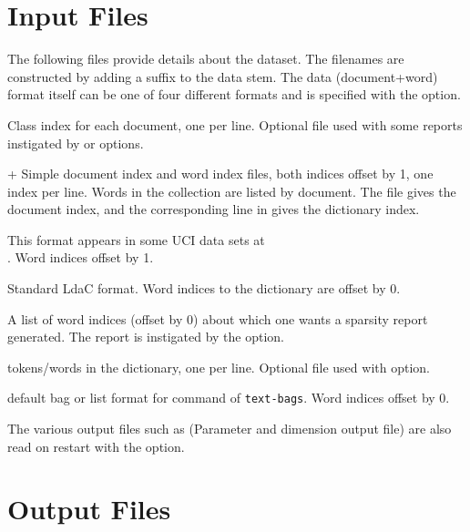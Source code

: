 \documentclass[a4paper,english]{article}
\begin{document}
\section{Input Files}

The following files provide details about the dataset.
The filenames are constructed by adding a suffix to the data stem.
The data (document+word) format itself can be one of four different
formats and is specified with the  option.
\begin{Description}\setlength{\itemsep}{0cm}
\item[\File{DataStem.class}] Class index for each document, one per line.  
Optional file used with some reports instigated by
 or  options.
\item[\File{DataStem.dit}+\File{DataStem.wit}] Simple document index and word index files, both indices offset by 1, one index per line.  
Words in the collection are listed by document.  The  file
gives the document index, and the corresponding line in 
gives the dictionary index.  
\item[\File{DataStem.docword}] This format appears in some UCI data sets
at\\.
Word indices offset by 1.
\item[\File{DataStem.ldac}] Standard LdaC format.  Word indices to the dictionary are offset by 0.
\item[\File{DataStem.smap}] A list of word indices (offset by 0)
about which one wants a sparsity report generated.
The report is instigated by the
 option.
\item[\File{DataStem.tokens}] tokens/words in the dictionary, one per line.
Optional file used with  option.
\item[\File{DataStem.txtbag}] default bag or list format for  command of \texttt{text-bags}.  Word indices offset by 0.
\end{Description}

The various output files such as
 (Parameter and dimension output file)
are also read on restart with the  option.

\section{Output Files}
\end{document}
